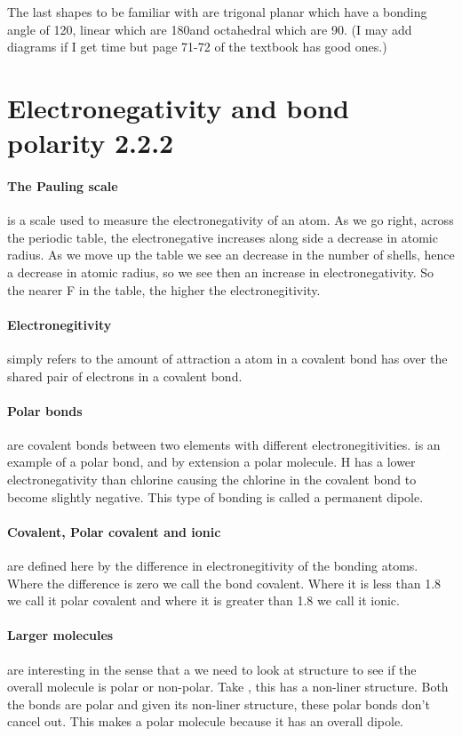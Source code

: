 	The last shapes to be familiar with are trigonal planar which have a bonding angle of 120\degree , linear which are 180\degree and octahedral which are 90\degree . (I may add diagrams if I get time but page 71-72 of the textbook has good ones.)
	
\section{Electronegativity and bond polarity 2.2.2}
	\paragraph{The Pauling scale} is a scale used to measure the electronegativity of an atom. As we go right, across the periodic table, the electronegative increases along side a decrease in atomic radius. As we move up the table we see an decrease in the number of shells, hence a decrease in atomic radius, so we see then an increase in electronegativity. So the nearer F in the table, the higher the electronegitivity.
	
	\paragraph{Electronegitivity} simply refers to the amount of attraction a atom in a covalent bond has over the shared pair of electrons in a covalent bond.
	
	\paragraph{Polar bonds} are covalent bonds between two elements with different electronegitivities.
	 is an example of a polar bond, and by extension a polar molecule.
	H has a lower electronegativity than chlorine causing the chlorine in the covalent bond to become slightly negative.
	This type of bonding is called a permanent dipole.

	\paragraph{Covalent, Polar covalent and ionic} are defined here by the difference in electronegitivity of the bonding atoms.
	Where the difference is zero we call the bond covalent.
	Where it is less than 1.8 we call it polar covalent and where it is greater than 1.8 we call it ionic.
	
	\paragraph{Larger molecules} are interesting in the sense that a we need to look at structure to see if the overall molecule is polar or non-polar.
	Take , this has a non-liner structure. Both the  bonds are polar and given its non-liner structure, these polar bonds don't cancel out.
	This makes  a polar molecule because it has an overall dipole.
	
